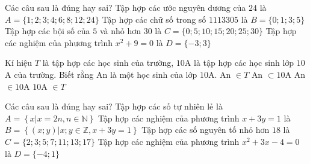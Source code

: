 
\begin{ex}%
	Các câu sau là  đúng hay sai?
	 \choiceTF
		{\True Tập hợp các  ước nguyên dương của $24$ là $A=\{1;2;3;4;6;8;12;24\}$}
		{\True Tập hợp các chữ số trong số  $1113305$ là $B=\{0;1;3;5\}$}
		{Tập hợp các bội số của $5$ và  nhỏ hơn $30$ là $C=\{0;5;10;15;20;25;30\}$}
		{Tập hợp các nghiệm của phương  trình $x^2+9=0$ là $D=\{-3;3\}$}
\end{ex}

\begin{ex}%
	 Kí hiệu $T$ là tập hợp các học sinh của trường, $10$A là tập hợp các học sinh lớp $10$A của trường. Biết rằng An là một học sinh của lớp $10$A.
	 \choiceTF
		{\True An  $\in T$}
		{An $\subset 10$A} 
		{\True An $\in  10$A}
		 {$10$A $\in T$}
\end{ex}

\begin{ex}%
	Các  câu sau là đúng hay sai?
	 \choiceTF
		{Tập hợp các số tự nhiên lẻ là  $A=\left\{x\Big|x=2n, n\in\mathbb{N}\right\}$}
		{Tập hợp các nghiệm của phương trình $x+3y=1$ là $B=\left\{(x;y)\Big|x;y\in\mathbb{Z},  x+3y=1\right\}$}
		{\True Tập hợp các số nguyên tố nhỏ hơn $18$  là $C=\{2;3;5;7;11;13;17\}$}
		{\True Tập hợp các nghiệm của  phương trình $x^2+3x-4=0$ là $D=\{-4;1\}$}
\end{ex}

